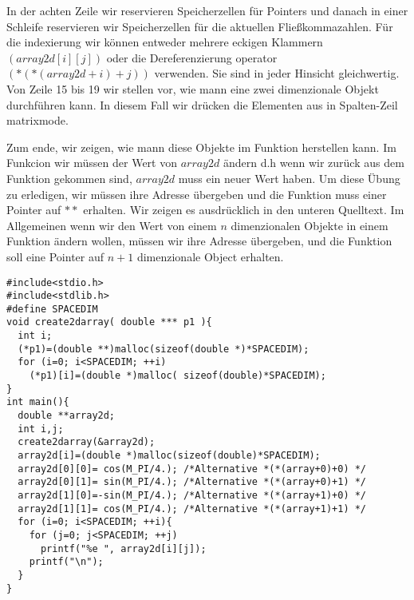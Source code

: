 In der achten Zeile wir reservieren Speicherzellen für Pointers
und danach in einer Schleife reservieren wir Speicherzellen für
die aktuellen Fließkommazahlen. Für die indexierung wir können
entweder mehrere eckigen Klammern $(array2d[i][j])$ oder
die Dereferenzierung operator $(*(*(array2d+i)+j))$ verwenden.
Sie sind in jeder Hinsicht gleichwertig. Von Zeile 15 bis 19 
wir stellen vor, wie mann eine zwei dimenzionale Objekt
durchführen kann. In diesem Fall wir 
drücken die Elementen aus in Spalten-Zeil matrixmode.

Zum ende, wir zeigen, wie mann diese Objekte im Funktion herstellen kann.
Im Funkcion wir müssen der Wert von $array2d$ ändern d.h wenn wir zurück
aus dem Funktion gekommen sind, $array2d$ muss ein neuer Wert haben.
Um diese Übung zu erledigen, wir müssen ihre Adresse übergeben und
die Funktion muss einer Pointer auf $**$ erhalten. Wir zeigen 
es ausdrücklich in den unteren Quelltext. Im Allgemeinen 
wenn wir den Wert von einem $n$ dimenzionalen Objekte in einem
Funktion ändern wollen, müssen wir ihre Adresse übergeben, und die Funktion soll
eine Pointer auf $n+1$ dimenzionale Object erhalten.
\begin{lstlisting}
#include<stdio.h>
#include<stdlib.h>
#define SPACEDIM
void create2darray( double *** p1 ){
  int i;
  (*p1)=(double **)malloc(sizeof(double *)*SPACEDIM);
  for (i=0; i<SPACEDIM; ++i)
    (*p1)[i]=(double *)malloc( sizeof(double)*SPACEDIM);
}
int main(){
  double **array2d;
  int i,j;
  create2darray(&array2d);
  array2d[i]=(double *)malloc(sizeof(double)*SPACEDIM);
  array2d[0][0]= cos(M_PI/4.); /*Alternative *(*(array+0)+0) */
  array2d[0][1]= sin(M_PI/4.); /*Alternative *(*(array+0)+1) */
  array2d[1][0]=-sin(M_PI/4.); /*Alternative *(*(array+1)+0) */
  array2d[1][1]= cos(M_PI/4.); /*Alternative *(*(array+1)+1) */
  for (i=0; i<SPACEDIM; ++i){
    for (j=0; j<SPACEDIM; ++j)
      printf("%e ", array2d[i][j]);
    printf("\n");
  }
}
\end{lstlisting}
